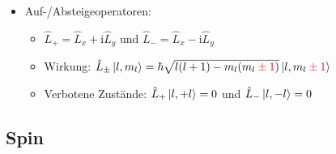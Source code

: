 \documentclass[a4paper,11pt]{article}
\newcommand{\ii}{\mathrm{i}}
\newcommand{\hb}{\hbar}
\begin{document}
\begin{itemize}
\begin{itemize}
    \item Bahndrehimpulsquantenzahl $l$: $l = 0,1,2,3, \dots $ (s-, p-, d-, f- Orbital)
    \item magnetische Bahndreimpuls-QZ $m_l$: $m_l \in {-l, -l+1, \dots, l}$
    \begin{itemize}
      \item $m_l$ gibt die z-Komponente von $l$ an $\rightarrow$ führt bei $l=1$ zu den p-Orbitalen
      \item Entartungsgrad ohne äußeres Magnetfeld: $2l +1$ \footnote{Gibt es ein Symbol für den Entartungsgrad?}
    \end{itemize}
    \item Eigenwerte: $\hat{L}^2\ket{l,m_l} = \hb^2 l(l+1)\ket{l, m_l} \qquad \hat{L}_z \ket{l, m_l} = \hb m_l \ket{l,m_l}$
  \end{itemize}
  \item Auf-/Absteigeoperatoren:
  \begin{itemize}
    \item $\hat{L}_+ = \hat{L}_x + \ii \hat{L}_y$ \quad und \quad $\hat{L}_- = \hat{L}_x - \ii \hat{L}_y$
    \item Wirkung: $\hat{L}_\pm \ket{l,m_l} = \hb \sqrt{l(l+1) - m_l(m_l \color{red}\pm 1 \color{black})}\ket{l, m_l \color{red} \pm 1}$
    \item Verbotene Zustände: $\hat{L}_+ \ket{l, +l} = 0$ \quad und \quad $\hat{L}_-\ket{l,-l}=0$
  \end{itemize}
\end{itemize}

\subsection*{Spin}
\end{document}
